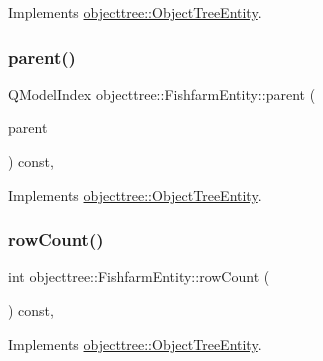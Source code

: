 Implements \mbox{\hyperlink{classobjecttree_1_1_object_tree_entity_a9ccaab3b27e65b1ed8b22f00c57a1082}{objecttree\+::\+Object\+Tree\+Entity}}.

\mbox{\label{classobjecttree_1_1_fishfarm_entity_aac4d7a77c41deb65f4521647789a689d}} 
\subsubsection{\texorpdfstring{parent()}{parent()}}
{\footnotesize\ttfamily Q\+Model\+Index objecttree\+::\+Fishfarm\+Entity\+::parent (\begin{DoxyParamCaption}\item[{const Q\+Model\+Index \&}]{parent }\end{DoxyParamCaption}) const\hspace{0.3cm}{\ttfamily [override]}, {\ttfamily [virtual]}}



Implements \mbox{\hyperlink{classobjecttree_1_1_object_tree_entity_a2d1b13c056476f87637aacd7e99e7305}{objecttree\+::\+Object\+Tree\+Entity}}.

\mbox{\label{classobjecttree_1_1_fishfarm_entity_afa62dcf3a29d5e9f1125e958196878aa}} 
\subsubsection{\texorpdfstring{rowCount()}{rowCount()}}
{\footnotesize\ttfamily int objecttree\+::\+Fishfarm\+Entity\+::row\+Count (\begin{DoxyParamCaption}{ }\end{DoxyParamCaption}) const\hspace{0.3cm}{\ttfamily [override]}, {\ttfamily [virtual]}}



Implements \mbox{\hyperlink{classobjecttree_1_1_object_tree_entity_a82c626bb28c55dcfce11cf7ec3368588}{objecttree\+::\+Object\+Tree\+Entity}}.

\mbox{\label{classobjecttree_1_1_fishfarm_entity_a8b3b7c802ae6f0bd79aacbb03b7d1f47}} 
